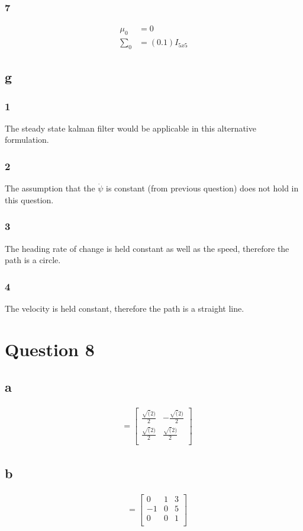 \documentclass[12pt]{article}
\begin{document}
\subsubsection{7}
\begin{align*}
    \mu_0    & = 0            \\
    {\sum}_0 & = (0.1)I_{5x5}
\end{align*}
\subsection{g}
\subsubsection{1}
The steady state kalman filter would be applicable in this alternative formulation.
\subsubsection{2}
The assumption that the $\dot\psi$ is constant (from previous question) does not hold in this question.
\subsubsection{3}
The heading rate of change is held constant as well as the speed, therefore the path is a circle.
\subsubsection{4}
The velocity is held constant, therefore the path is a straight line.


\section{Question 8}
\subsection{a}
\begin{align*}
     & = \begin{bmatrix}
        \frac{\sqrt(2)}{2} & -\frac{\sqrt(2)}{2} \\
        \frac{\sqrt(2)}{2} & \frac{\sqrt(2)}{2}  \\
    \end{bmatrix}
\end{align*}
\subsection{b}
\begin{align*}
     & = \begin{bmatrix}
        0  & 1 & 3 \\
        -1 & 0 & 5 \\
        0  & 0 & 1 \\
    \end{bmatrix}
\end{align*}
\end{document}
